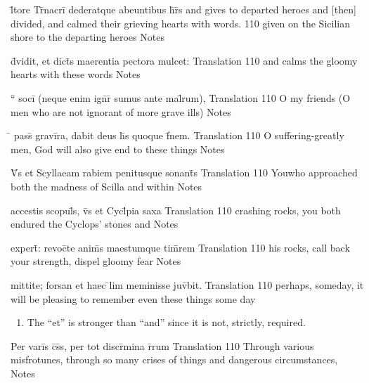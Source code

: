 \documentclass[]{book}
\begin{document}
\latline
  {l\={\macron {\i}}tore Tr\={\macron {\i}}nacri\={} dederatque abeuntibus h\={}r\={}s}
  { and gives to departed heroes and [then] divided, and calmed their grieving hearts with words. }
  {110}
  { given on the Sicilian shore to the departing heroes }
  { Notes }


\latline
  {d\={\macron {\i}}vidit, et dict\={\macron {\i}}s maerentia pectora mulcet:}
  { Translation }
  {110}
  { and calms the gloomy hearts with these words }
  { Notes }


\latline
  {``\={} soci\={\macron {\i}} (neque enim ign\={}r\={\macron {\i}} sumus ante mal\={}rum),}
  { Translation }
  {110}
  { O my friends (O men who are not ignorant of more grave ills) }
  { Notes }


\latline
  {\={} pass\={\macron {\i}} gravi\={}ra, dabit deus h\={\macron {\i}}s quoque f\={\macron {\i}}nem.}
  { Translation }
  {110}
  { O suffering-greatly men, God will also give end to these things }
  { Notes }


\latline
  {V\={}s et Scyllaeam rabiem penitusque sonant\={\macron {\i}}s}
  { Translation }
  {110}
  { Youwho approached both the madness of Scilla and within }
  { Notes }


\latline
  {accestis scopul\={}s, v\={}s et Cycl\={}pia saxa }
  { Translation }
  {110}
  { crashing rocks, you both endured the Cyclops' stones and }
  { Notes }


\latline
  {expert\={\macron {\i}}:  revoc\={}te anim\={}s maestumque tim\={}rem}
  { Translation }
  {110}
  { his rocks, call back your strength, dispel gloomy fear }
  { Notes }


\latline
  {mittite; forsan et haec \={}lim meminisse juv\={}bit.}
  { Translation }
  {110}
  { perhaps, someday, it will be pleasing to remember even these things some day }
  { \begin{enumerate}
  	\item The ``et'' is stronger than ``and'' since it is not, strictly, required.  
  \end{enumerate} }


\latline
  {Per vari\={}s c\={}s\={}s, per tot discr\={\macron {\i}}mina r\={}rum}
  { Translation }
  {110}
  { Through various misfrotunes, through so many crises of things and dangerous circumstances, }
  { Notes }
\end{document}
